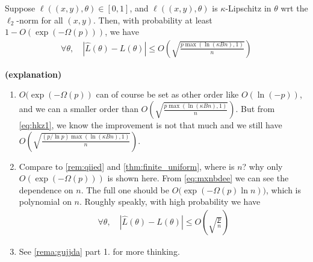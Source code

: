 \documentclass{article}
\newcommand{\bfs}[1]{\textbf{({#1}) }}
\begin{document}
\begin{thma}\label{thm:infinite_uniform}
Suppose $\ell((x, y), \theta) \in[0,1]$, and $\ell((x, y), \theta)$ is $\kappa$-Lipschitz in $\theta$ \gls{wrt} the $\ell_{2}$-norm for all $(x, y)$. Then, with probability at least $1-O(\exp (-\Omega(p)))$, we have 
\begin{align*}
\forall \theta, \quad|\hat{L}(\theta)-L(\theta)| \leq O\left(\sqrt{\frac{p \max (\ln (\kappa B n), 1)}{n}}\right)
\end{align*}
\end{thma}
\begin{rema}\bfs{explanation}
\begin{enumerate}
    \item $O(\exp (-\Omega(p))$ can of course be set as other order like $O(\ln (-p))$, and we can a smaller order than $O\left(\sqrt{\frac{p \max (\ln (\kappa B n), 1)}{n}}\right)$. But from \cref{eq:hkz1}, we know the improvement is not that much and we still have $O\left(\sqrt{\frac{(p/\ln p) \max (\ln (\kappa B n), 1)}{n}}\right)$.
    \item Compare to \cref{rem:qiied} and \cref{thm:finite_uniform}, where is $n$? why only $O(\exp (-\Omega(p)))$ is shown here.  From \cref{eq:mxnbdee} we can see the dependence on $n$. The full one should be $O\big(\exp (-\Omega(p)\ln n)\big)$, which is polynomial on $n$.  Roughly speakly, with high probability we have \begin{align*}
\forall \theta, \quad|\hat{L}(\theta)-L(\theta)| \leq O\left(\sqrt{\frac{p}{n}}\right)
\end{align*}
    \item See  \cref{rema:gujjda} part 1. for more thinking.
\end{enumerate}

\end{rema}
\end{document}
